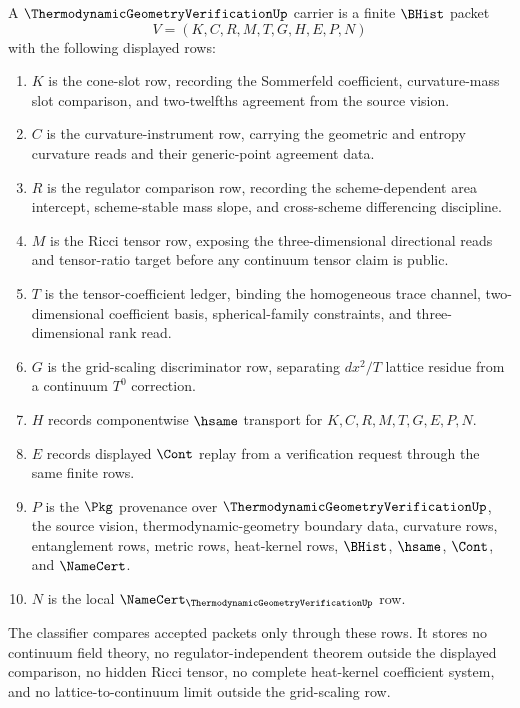 \begin{definition}
\label{def:thermodynamic-geometry-verification-carrier}
A $\ThermodynamicGeometryVerificationUp$ carrier is a finite $\BHist$ packet
$$
V=(K,C,R,M,T,G,H,E,P,N)
$$
with the following displayed rows:
\begin{enumerate}
\item $K$ is the cone-slot row, recording the Sommerfeld coefficient, curvature-mass slot comparison, and two-twelfths agreement from the source vision.
\item $C$ is the curvature-instrument row, carrying the geometric and entropy curvature reads and their generic-point agreement data.
\item $R$ is the regulator comparison row, recording the scheme-dependent area intercept, scheme-stable mass slope, and cross-scheme differencing discipline.
\item $M$ is the Ricci tensor row, exposing the three-dimensional directional reads and tensor-ratio target before any continuum tensor claim is public.
\item $T$ is the tensor-coefficient ledger, binding the homogeneous trace channel, two-dimensional coefficient basis, spherical-family constraints, and three-dimensional rank read.
\item $G$ is the grid-scaling discriminator row, separating $dx^2/T$ lattice residue from a continuum $T^0$ correction.
\item $H$ records componentwise $\hsame$ transport for $K,C,R,M,T,G,E,P,N$.
\item $E$ records displayed $\Cont$ replay from a verification request through the same finite rows.
\item $P$ is the $\Pkg$ provenance over $\ThermodynamicGeometryVerificationUp$, the source vision, thermodynamic-geometry boundary data, curvature rows, entanglement rows, metric rows, heat-kernel rows, $\BHist$, $\hsame$, $\Cont$, and $\NameCert$.
\item $N$ is the local $\NameCert_{\ThermodynamicGeometryVerificationUp}$ row.
\end{enumerate}
The classifier compares accepted packets only through these rows. It stores no continuum field theory, no regulator-independent theorem outside the displayed comparison, no hidden Ricci tensor, no complete heat-kernel coefficient system, and no lattice-to-continuum limit outside the grid-scaling row.
\end{definition}

